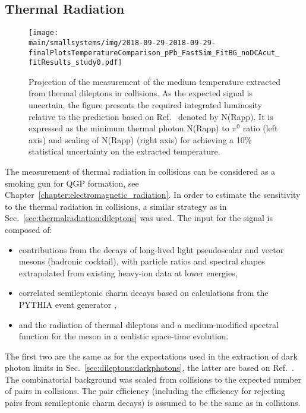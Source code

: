 \documentclass[../report.tex]{subfiles}
\providecommand{\main}{..}
\begin{document}
\subsection{Thermal Radiation}
\label{sect:smallsystems_thermalradiation}

\begin{figure}[t]
\centering
\texttt{[image: \\main/smallsystems/img/2018-09-29-2018-09-29-finalPlotsTemperatureComparison\_pPb\_FastSim\_FitBG\_noDCAcut\_fitResults\_study0.pdf]}
\caption{Projection of the measurement of the medium temperature extracted from thermal dileptons in \pPb collisions. As the expected signal is uncertain, the figure presents the required integrated luminosity relative to the prediction based on Ref.~\cite{} denoted by N(Rapp). It is expressed as the minimum thermal photon N(Rapp) to $\pi^0$ ratio (left axis) and scaling of N(Rapp) (right axis) for achieving a 10\% statistical uncertainty on the extracted temperature.}
\label{fig:smallsystems_thermal_radition}
\end{figure}

The measurement of thermal radiation in \pPb collisions can be considered as a smoking gun for QGP formation, see Chapter~\ref{chapter:electromagnetic_radiation}. In order to estimate the sensitivity to the thermal radiation in \pPb collisions, a similar strategy as in Sec.~\ref{sec:thermalradiation:dileptons} was used.
The input for the signal is composed of: 
\begin{itemize}
\item contributions from the decays of long-lived light pseudoscalar and vector mesons (hadronic cocktail), with particle ratios and spectral shapes extrapolated from existing heavy-ion data at lower energies,
\item correlated semileptonic charm decays based on calculations from the PYTHIA event generator \cite{Sjostrand:2006za},
\item and the radiation of thermal dileptons and a medium-modified spectral function for the \Prho meson in a realistic space-time evolution.
\end{itemize}
The first two are the same as for the expectations used in the extraction of dark photon limits in Sec.~\ref{sec:dileptons:darkphotons}, the latter are based on Ref.~\cite{}. The combinatorial background was scaled from \PbPb collisions to the expected number of pairs in \pPb collisions. The pair efficiency (including the efficiency for rejecting \Pepem pairs from semileptonic charm decays) is assumed to be the same as in \PbPb collisions.
\end{document}
